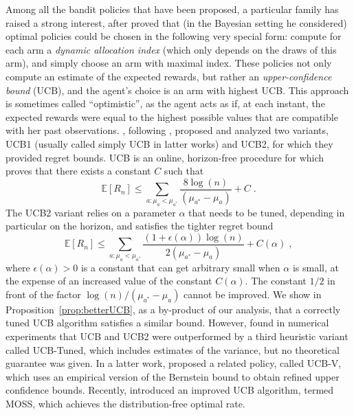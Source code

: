 \documentclass[wcp]{jmlr}
\newcommand{\E}{\mathbb{E}}
\newcommand{\1}{\mathbbm{1}}
\begin{document}
Among all the bandit policies that have been proposed, a particular family has
raised a strong interest, after \cite{Gittins79bandits} proved that (in
the Bayesian setting he considered) optimal policies could be chosen in the
following very special form: compute for each arm a \emph{dynamic allocation
  index} (which only depends on the draws of this arm), and simply choose an
arm with maximal index. These policies not only compute an estimate of the
expected rewards, but rather an \emph{upper-confidence bound} (UCB), and the
agent's choice is an arm with highest UCB. This approach is sometimes called
``optimistic'', as the agent acts as if, at each instant, the expected rewards 
were equal to the highest possible values that are compatible with her past observations.  \cite{AuerEtAl02FiniteTime}, following \cite{Agrawal:95},
proposed and analyzed two variants, UCB1 (usually called simply UCB in latter works) and UCB2, for which they provided regret
bounds. UCB is an online, horizon-free procedure for which \citep{AuerEtAl02FiniteTime} proves that there exists a constant $C$ such that
\begin{equation}\label{eq:UCBAuer}
\E[R_n] \leq \sum_{a:\mu_a<\mu_{a^*}} \frac{8\log(n)}{\left( \mu_{a^*}-\mu_{a} \right)} + C \; .
\end{equation}
The UCB2 variant relies on a parameter $\alpha$ that needs to
be tuned, depending in particular on the horizon, and satisfies the tighter regret bound
\begin{equation*}
\E[R_n] \leq \sum_{a:\mu_a<\mu_{a^*}} \frac{(1+\epsilon(\alpha))\log(n)}{2\left(\mu_{a^*}-\mu_{a} \right)} + C(\alpha) \; ,
\end{equation*}
where $\epsilon(\alpha) > 0$ is a constant that can get arbitrary small when
$\alpha$ is small, at the expense of an increased value of the constant $C(\alpha)$.
The constant $1/2$ in front of the factor $\log(n)/\left(\mu_{a^*}-\mu_{a}
\right)$ cannot be improved. We show in Proposition~\ref{prop:betterUCB}, as a by-product of our analysis, that a correctly tuned UCB algorithm satisfies a similar bound.
However, \cite{AuerEtAl02FiniteTime} found in numerical experiments that UCB and UCB2 were outperformed by a third heuristic variant called UCB-Tuned, which includes estimates of the variance, but no theoretical guarantee was given. In a latter work, \cite{AudibertEtAlUCBV} proposed a related policy, called UCB-V, which uses an empirical version of the Bernstein bound to obtain refined upper confidence bounds. Recently, \cite{audibert:bubeck:2010:minimax} introduced an improved UCB algorithm, termed MOSS, which achieves the distribution-free optimal rate.
\end{document}
